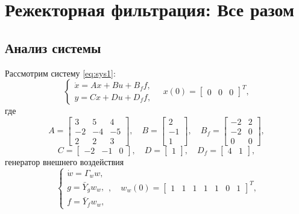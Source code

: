 \section{Режекторная фильтрация: Все разом}

\subsection{Анализ системы}

Рассмотрим систему \eqref{eq:sys1}:
\begin{equation}
    \begin{cases}
        \dot x = Ax+Bu+B_ff,\\
        y=Cx+Du+D_ff,
    \end{cases}\quad x(0)=\begin{bmatrix}
        0&0&0
    \end{bmatrix}^T,
\end{equation}
где
\begin{equation*}
    A=\begin{bmatrix}
        3 & 5 & 4 \\
        -2 & -4 & -5 \\
        2 & 2 & 3
    \end{bmatrix},\quad
    B=\begin{bmatrix}
        2 \\ -1 \\ 1
    \end{bmatrix},\quad
    B_f=\begin{bmatrix}
        -2 & 2 \\ -2 & 0 \\ 0 & 0
    \end{bmatrix},
\end{equation*}
\begin{equation*}
    C=\begin{bmatrix}
        -2&-1&0
    \end{bmatrix},\quad
    D=\begin{bmatrix}
        1
    \end{bmatrix},\quad
    D_f=\begin{bmatrix}
        4&1
    \end{bmatrix},
\end{equation*}
генератор внешнего воздействия
\begin{equation}
    \label{eq:sys_fg}
    \begin{cases}
        \dot w=\Gamma_ww,\\
        g=\bar Y_gw_w,\\
        f=\bar Y_fw_w,
    \end{cases},\quad     w_w(0)=\begin{bmatrix}
        1&1&1&1&1&0&1
    \end{bmatrix}^T,
\end{equation}
